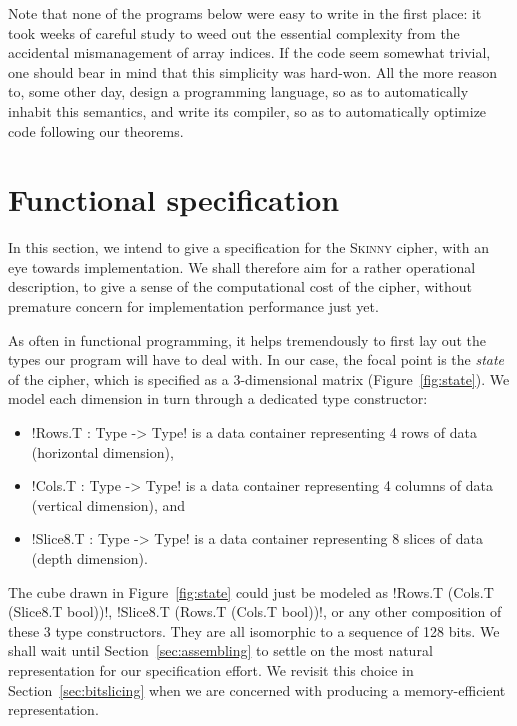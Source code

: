 \documentclass[draft,english]{jflart}
\newcommand{\Skinny}{\textsc{Skinny}}
\begin{document}
Note that none of the programs below were easy to write in the first
place: it took weeks of careful study to weed out the essential
complexity from the accidental mismanagement of array indices. If the
code seem somewhat trivial, one should bear in mind that this
simplicity was hard-won. All the more reason to, some other day,
design a programming language, so as to automatically inhabit this
semantics, and write its compiler, so as to automatically optimize
code following our theorems.

\section{Functional specification}
\label{sec:spec}


In this section, we intend to give a specification for the \Skinny{}
cipher, with an eye towards implementation. We shall therefore aim for
a rather operational description, to give a sense of the computational
cost of the cipher, without premature concern for implementation
performance just yet.


As often in functional programming, it helps tremendously to first lay
out the types our program will have to deal with. In our case, the
focal point is the \emph{state} of the cipher, which is specified as a
3-dimensional matrix (Figure~\ref{fig:state}). We model each dimension
in turn through a dedicated type constructor:
%
\begin{itemize}[nosep]
\item \coqe!Rows.T : Type -> Type! is a data container representing 4 rows of data (horizontal dimension),
\item \coqe!Cols.T : Type -> Type! is a data container representing 4 columns of data (vertical dimension), and
\item \coqe!Slice8.T : Type -> Type! is a data container representing
  8 slices of data (depth dimension).
\end{itemize}

The cube drawn in Figure~\ref{fig:state} could just be modeled as
%
\coqe!Rows.T (Cols.T (Slice8.T bool))!,
%
\coqe!Slice8.T (Rows.T (Cols.T bool))!,
%
or any other composition of these 3 type constructors. They are all
isomorphic to a sequence of 128 bits. We shall wait until
Section~\ref{sec:assembling} to settle on the most natural
representation for our specification effort. We revisit this choice in
Section~\ref{sec:bitslicing} when we are concerned with producing a
memory-efficient representation.
\end{document}
